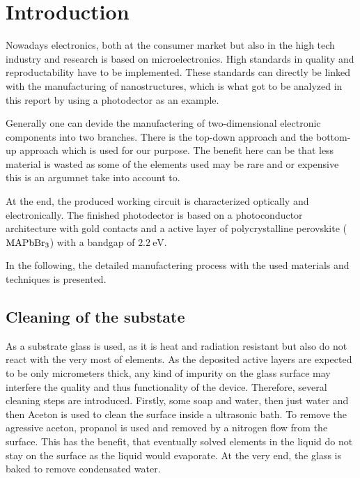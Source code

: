 


\section{Introduction}
\label{sec:Introduction}

Nowadays electronics, both at the consumer market but also in the high tech industry and research is based on microelectronics.
High standards in quality and reproductability have to be implemented.
These standards can directly be linked with the manufacturing of nanostructures, which is what got to be analyzed in this report by using a photodector as an example.

Generally one can devide the manufactering of two-dimensional electronic components into two branches.
There is the top-down approach and the bottom-up approach which is used for our purpose.
The benefit here can be that less material is wasted as some of the elements used may be rare and or expensive this is an argumnet take into account to.

At the end, the produced working circuit is characterized optically and electronically. 
The finished photodector is based on a photoconductor architecture with gold contacts and a active layer of polycrystalline perovskite ($\ce{MAPbBr_3}$) with a bandgap of $\SI{2.2}{\eV}$.

In the following, the detailed manufactering process with the used materials and techniques is presented.

\subsection{Cleaning of the substate}
\label{sec:cleaning}

As a substrate glass is used, as it is heat and radiation resistant but also do not react with the very most of elements.
As the deposited active layers are expected to be only micrometers thick, any kind of impurity on the glass surface may interfere the quality and thus functionality of the device.
Therefore, several cleaning steps are introduced.
Firstly, some soap and water, then just water and then Aceton is used to clean the surface inside a ultrasonic bath.
To remove the agressive aceton, propanol is used and removed by a nitrogen flow from the surface.
This has the benefit, that eventually solved elements in the liquid do not stay on the surface as the liquid would evaporate.
At the very end, the glass is baked to remove condensated water.

